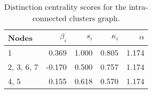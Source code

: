 \begin{table}
\centering
\caption{\label{tab:intra}Distinction centrality scores for the intra-connected clusters graph.}
\centering
\begin{tabular}[t]{lrrrr}
\toprule
Nodes & $\beta_i$ & $s_i$ & $\kappa_i$ & $\alpha$\\
\midrule
1 & 0.369 & 1.000 & 0.805 & 1.174\\
2, 3, 6, 7 & -0.170 & 0.500 & 0.757 & 1.174\\
4, 5 & 0.155 & 0.618 & 0.570 & 1.174\\
\bottomrule
\end{tabular}
\end{table}
